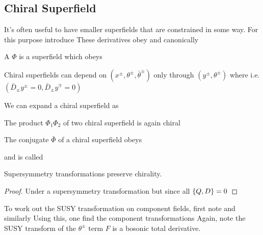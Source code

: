 \documentclass{article}
\begin{document}
\subsection{Chiral Superfield}
It's often useful to have smaller superfields that are constrained in some way. For this purpose introduce 
These derivatives obey 
and canonically 
\begin{definition}
A  $\Phi$ is  a superfield which obeys 
\end{definition}
\begin{lemma}
Chiral superfields can depend on $(x^\pm, \theta^\pm, \bar{\theta}^\pm)$ only through $(y^\pm,\theta^\pm)$ where 
i.e. $(\bar{D}_\pm y^\pm = 0, \bar{D}_\pm y^\mp = 0)$
\end{lemma}
We can expand a chiral superfield as 
\begin{lemma}
The product $\Phi_1 \Phi_2$ of two chiral superfield is again chiral
\end{lemma}
\begin{lemma}
	The conjugate $\bar{\Phi}$ of a chiral superfield obeys 
\end{lemma}
and is called 
\begin{lemma}
Supersymmetry transformations preserve chirality.	
\end{lemma}
\begin{proof}
Under a supersymmetry transformation 
\eq{
\Phi \to \Phi + \delta \Phi
}
but since all $\acomm[Q]{D} = 0$
\end{proof}
To work out the SUSY transformation on component fields, first note 
and similarly 
Using this, one find the component transformations 
Again, note the SUSY transform of the $\theta^\pm$ term $F$ is a bosonic total derivative. 
\end{document}
